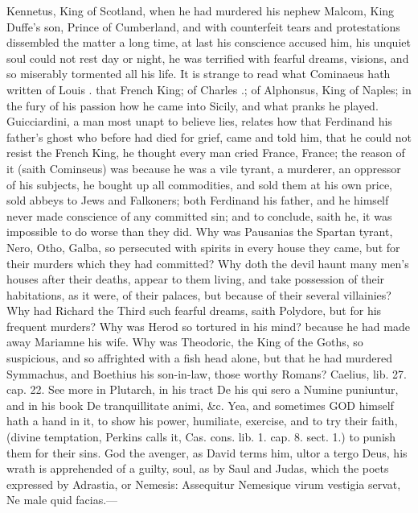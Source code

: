 {Kennetus, King of Scotland, when he had murdered his nephew
Malcom, King Duffe's son, Prince of Cumberland, and with counterfeit
tears and protestations dissembled the matter a long time, at
last his conscience accused him, his unquiet soul could not rest day or
night, he was terrified with fearful dreams, visions, and so miserably
tormented all his life. It is strange to read what Cominaeus hath
written of Louis . that French King; of Charles .; of Alphonsus,
King of Naples; in the fury of his passion how he came into Sicily, and
what pranks he played. Guicciardini, a man most unapt to believe lies,
relates how that Ferdinand his father's ghost who before had died for
grief, came and told him, that he could not resist the French King, he
thought every man cried France, France; the reason of it (saith
Cominseus) was because he was a vile tyrant, a murderer, an oppressor
of his subjects, he bought up all commodities, and sold them at his own
price, sold abbeys to Jews and Falkoners; both Ferdinand his father,
and he himself never made conscience of any committed sin; and to
conclude, saith he, it was impossible to do worse than they did. Why
was Pausanias the Spartan tyrant, Nero, Otho, Galba, so persecuted with
spirits in every house they came, but for their murders which they had
committed? Why doth the devil haunt many men's houses after their
deaths, appear to them living, and take possession of their
habitations, as it were, of their palaces, but because of their several
villainies? Why had Richard the Third such fearful dreams, saith
Polydore, but for his frequent murders? Why was Herod so tortured in
his mind? because he had made away Mariamne his wife. Why was
Theodoric, the King of the Goths, so suspicious, and so affrighted with
a fish head alone, but that he had murdered Symmachus, and Boethius his
son-in-law, those worthy Romans? Caelius, lib. 27. cap. 22. See more in
Plutarch, in his tract De his qui sero a Numine puniuntur, and in his
book De tranquillitate animi, \&c. Yea, and sometimes \textsc{GOD} himself hath a
hand in it, to show his power, humiliate, exercise, and to try their
faith, (divine temptation, Perkins calls it, Cas. cons. lib. 1. cap. 8.
sect. 1.) to punish them for their sins. God the avenger, as
David terms him, ultor a tergo Deus, his wrath is apprehended of
a guilty, soul, as by Saul and Judas, which the poets expressed by
Adrastia, or Nemesis:
Assequitur Nemesique virum vestigia servat,
Ne male quid facias.---

}
